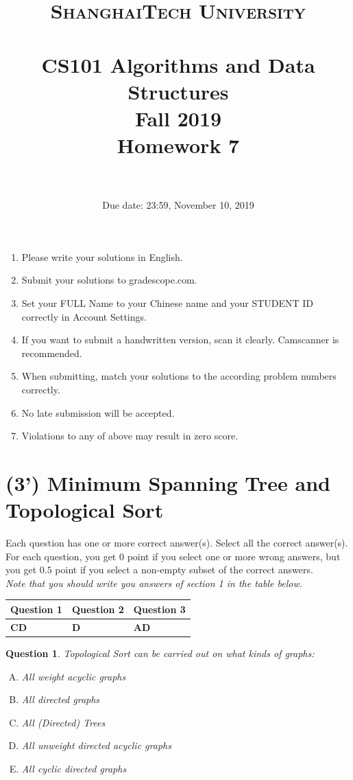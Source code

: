 \documentclass{article}
\title{
    \normalfont \normalsize
    \textsc{ShanghaiTech University} \\ [25pt]
    \horrule{0.5pt} \\[0.4cm] %
    \huge CS101 Algorithms and Data Structures\\ %
    \LARGE Fall 2019\\
    \LARGE Homework 7\\
    \horrule{2pt} \\[0.5cm] %
}
\author{}
\date{Due date: 23:59, November 10, 2019}
\newtheorem{Q}{Question}
\begin{document}
\maketitle
\thispagestyle{firstpage}
\vspace{3ex}

\begin{enumerate}
\item Please write your solutions in English. 

\item Submit your solutions to gradescope.com.  

\item Set your FULL Name to your Chinese name and your STUDENT ID correctly in Account Settings. 

\item If you want to submit a handwritten version, scan it clearly. Camscanner is recommended. 

\item When submitting, match your solutions to the according problem numbers correctly. 

\item No late submission will be accepted.

\item Violations to any of above may result in zero score. 
\end{enumerate}
\newpage

\section{(3') Minimum Spanning Tree and Topological Sort}
Each question has one or more correct answer(s). Select all the correct answer(s). For each question, you get $0$ point if you select one or more wrong answers, but you get $0.5$ point if you select a non-empty subset of the correct answers.\\
\textit{Note that you should write you answers of section 1 in the table below.}
\begin{table}[htbp]
	\begin{tabular}{|p{2cm}|p{2cm}|p{2cm}|}
		\hline 
		Question 1 & Question 2 & Question 3  \\ 
		\hline 
		\textbf{CD} &\textbf{D}  &\textbf{AD}   \\ 
		\hline 
	\end{tabular} 
\end{table}
\begin{Q}
Topological Sort can be carried out on what kinds of graphs:
\begin{enumerate}[(A)]
	\item All weight acyclic graphs
	\item All directed graphs
	\item All (Directed) Trees
	\item All unweight directed acyclic graphs
	\item All cyclic directed graphs
\end{enumerate}
\end{Q}
\end{document}
